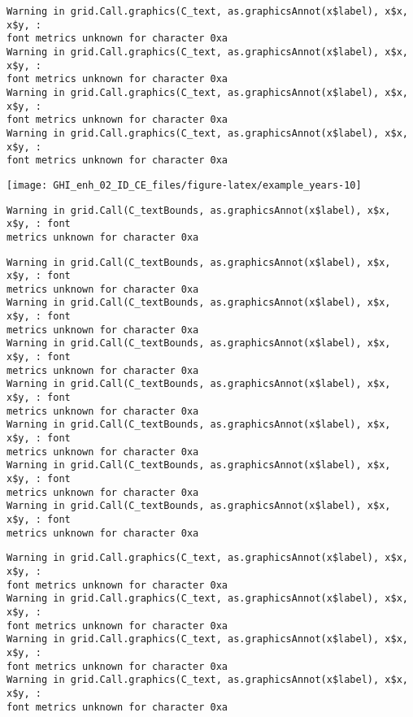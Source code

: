 \documentclass[
  10pt,
  a4paper,oneside]{article}
\begin{document}
\begin{verbatim}
Warning in grid.Call.graphics(C_text, as.graphicsAnnot(x$label), x$x, x$y, :
font metrics unknown for character 0xa
Warning in grid.Call.graphics(C_text, as.graphicsAnnot(x$label), x$x, x$y, :
font metrics unknown for character 0xa
Warning in grid.Call.graphics(C_text, as.graphicsAnnot(x$label), x$x, x$y, :
font metrics unknown for character 0xa
Warning in grid.Call.graphics(C_text, as.graphicsAnnot(x$label), x$x, x$y, :
font metrics unknown for character 0xa
\end{verbatim}

\begin{center}\texttt{[image: GHI\_enh\_02\_ID\_CE\_files/figure-latex/example\_years-10]} \end{center}

\begin{verbatim}
Warning in grid.Call(C_textBounds, as.graphicsAnnot(x$label), x$x, x$y, : font
metrics unknown for character 0xa
\end{verbatim}

\begin{verbatim}
Warning in grid.Call(C_textBounds, as.graphicsAnnot(x$label), x$x, x$y, : font
metrics unknown for character 0xa
Warning in grid.Call(C_textBounds, as.graphicsAnnot(x$label), x$x, x$y, : font
metrics unknown for character 0xa
Warning in grid.Call(C_textBounds, as.graphicsAnnot(x$label), x$x, x$y, : font
metrics unknown for character 0xa
Warning in grid.Call(C_textBounds, as.graphicsAnnot(x$label), x$x, x$y, : font
metrics unknown for character 0xa
Warning in grid.Call(C_textBounds, as.graphicsAnnot(x$label), x$x, x$y, : font
metrics unknown for character 0xa
Warning in grid.Call(C_textBounds, as.graphicsAnnot(x$label), x$x, x$y, : font
metrics unknown for character 0xa
Warning in grid.Call(C_textBounds, as.graphicsAnnot(x$label), x$x, x$y, : font
metrics unknown for character 0xa
\end{verbatim}

\begin{verbatim}
Warning in grid.Call.graphics(C_text, as.graphicsAnnot(x$label), x$x, x$y, :
font metrics unknown for character 0xa
Warning in grid.Call.graphics(C_text, as.graphicsAnnot(x$label), x$x, x$y, :
font metrics unknown for character 0xa
Warning in grid.Call.graphics(C_text, as.graphicsAnnot(x$label), x$x, x$y, :
font metrics unknown for character 0xa
Warning in grid.Call.graphics(C_text, as.graphicsAnnot(x$label), x$x, x$y, :
font metrics unknown for character 0xa
\end{verbatim}
\end{document}
